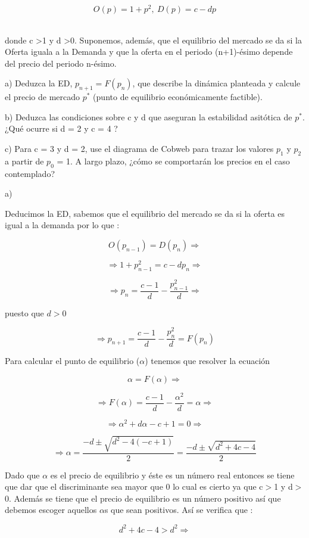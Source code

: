 \documentclass[11pt, a4paper, titlepage]{article}
\theoremstyle{theorem-style}
\theoremstyle{definition-style}
\theoremstyle{remark-style}
\theoremstyle{example-style}
\begin{document}
\[ 
O(p) = 1 + p^{2}, \ D(p) = c - dp
\]\

donde c \textgreater 1 y d \textgreater 0. Suponemos, adem\'as, que el equilibrio del mercado se da si la Oferta iguala a la Demanda y que la oferta en el periodo (n+1)-\'esimo depende del precio del periodo n-\'esimo.

a) Deduzca la ED, $p_{n+1} = F(p_n)$, que describe la din\'amica planteada y calcule el precio de mercado $p^{*}$ (punto de equilibrio econ\'omicamente factible).

b) Deduzca las condiciones sobre c y d que aseguran la estabilidad asit\'otica de $p^{*}$. ¿Qu\'e ocurre si d = 2 y c = 4 ?

c) Para c = 3 y d = 2, use el diagrama de Cobweb para trazar los valores $p_1$ y $p_2$ a partir de $p_0$ = 1. A largo plazo, ¿c\'omo se comportar\'an los precios en el caso contemplado?

a)

Deducimos la ED, sabemos que el equilibrio del mercado se da si la oferta es igual a la demanda por lo que :

\[
O(p_{n-1}) = D (p_n) \Rightarrow
\]

\[ 
\Rightarrow 1 + p_{n-1}^{2} = c - dp_n \Rightarrow 
\]

\[ 
\Rightarrow p_n = \frac{c-1}{d} - \frac{p_{n-1}^{2}}{d} \Rightarrow 
\]

puesto que $d>0$

\[
\Rightarrow p_{n+1} = \frac{c-1}{d} - \frac{p_{n}^{2}}{d} = F(p_n)
\]

Para calcular el punto de equilibrio ($\alpha$) tenemos que resolver la ecuaci\'on 

\[
\alpha = F(\alpha) \Rightarrow
\]

\[
\Rightarrow F(\alpha) = \frac{c-1}{d} - \frac{\alpha^{2}}{d} = \alpha \Rightarrow
\]

\[
\Rightarrow \alpha^{2} + d\alpha -c+1 = 0 \Rightarrow
\]

\[
\Rightarrow \alpha = \frac{-d\pm\sqrt{d^{2} - 4(-c+1)}}{2} = \frac{-d\pm\sqrt{d^{2} +4c-4}}{2}
\]

Dado que $\alpha$ es el precio de equilibrio y \'este es un n\'umero real entonces se tiene que dar que el discriminante sea mayor que 0 lo cual es cierto ya que c$>$1 y d$>$0. Adem\'as se tiene que el precio de equilibrio es un n\'umero positivo así que debemos escoger aquellos $\alpha$s que sean positivos. As\'i se verifica que :

\[
d^{2} +4c-4 > d^{2} \Rightarrow 
\]
\end{document}
